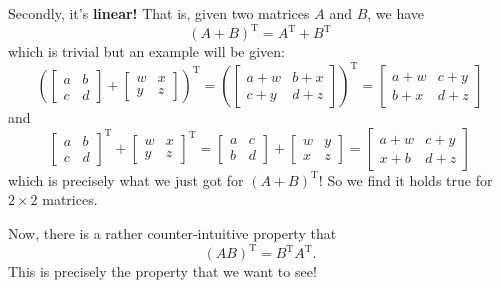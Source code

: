 Secondly, it's \textbf{linear!} That is, given two matrices $A$ and $B$, we have
\begin{equation}
(A + B)^{\textrm{T}} = A^{\textrm{T}} + B^{\textrm{T}}
\end{equation}
which is trivial but an example will be given:
\begin{equation}
\left(
\begin{bmatrix}
a & b \\
c & d
\end{bmatrix} + 
\begin{bmatrix}
w & x\\
y & z
\end{bmatrix}
\right)^{\textrm{T}} = 
\left(
\begin{bmatrix}
a+w & b+x \\
c+y & d+z
\end{bmatrix}\right)^{\textrm{T}} = \begin{bmatrix}
a+w & c+y \\
b+x & d+z
\end{bmatrix}
\end{equation}
and 
\begin{equation}
\begin{bmatrix}
a & b \\
c & d
\end{bmatrix}^{\textrm{T}} + 
\begin{bmatrix}
w & x\\
y & z
\end{bmatrix}^{\textrm{T}} = 
\begin{bmatrix}
a & c \\
b & d
\end{bmatrix} + 
\begin{bmatrix}
w & y\\
x & z
\end{bmatrix} =
\begin{bmatrix}
a+w & c+y\\
x+b & d+z
\end{bmatrix}
\end{equation}
which is precisely what we just got for $(A+B)^\textrm{T}$! So we find it holds true for $2\times 2$ matrices.

Now, there is a rather counter-intuitive property that
\begin{equation}
(AB)^\textrm{T} = B^\textrm{T}A^\textrm{T}.
\end{equation}
This is precisely the property that we want to see!
